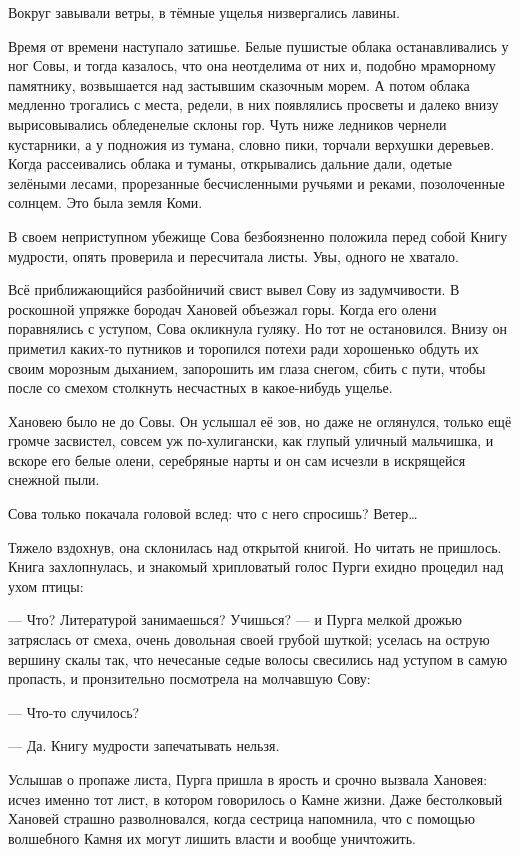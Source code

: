 \documentclass[oneside,final,14pt]{extreport}
\begin{document}
	Вокруг завывали ветры, в тёмные ущелья низвергались лавины.
	
	Время от времени наступало затишье. Белые пушистые облака останавливались у ног Совы, и тогда казалось, что она неотделима от них и, подобно мраморному памятнику, возвышается над застывшим сказочным морем. А потом облака медленно трогались с места, редели, в них появлялись просветы и далеко внизу вырисовывались обледенелые склоны гор. Чуть ниже ледников чернели кустарники, а у подножия из тумана, словно пики, торчали верхушки деревьев. Когда рассеивались облака и туманы, открывались дальние дали, одетые зелёными лесами, прорезанные бесчисленными ручьями и реками, позолоченные солнцем. Это была земля Коми.
	
	В своем неприступном убежище Сова безбоязненно положила перед собой Книгу мудрости, опять проверила и пересчитала листы. Увы, одного не хватало.
	
	Всё приближающийся разбойничий свист вывел Сову из задумчивости. В роскошной упряжке бородач Хановей объезжал горы. Когда его олени поравнялись с уступом, Сова окликнула гуляку. Но тот не остановился. Внизу он приметил каких-то путников и торопился потехи ради хорошенько обдуть их своим морозным дыханием, запорошить им глаза снегом, сбить с пути, чтобы после со смехом столкнуть несчастных в какое-нибудь ущелье.
	
	Хановею было не до Совы. Он услышал её зов, но даже не оглянулся, только ещё громче засвистел, совсем уж по-хулигански, как глупый уличный мальчишка, и вскоре его белые олени, серебряные нарты и он сам исчезли в искрящейся снежной пыли.
	
	Сова только покачала головой вслед: что с него спросишь? Ветер…
	
	Тяжело вздохнув, она склонилась над открытой книгой. Но читать не пришлось. Книга захлопнулась, и знакомый хрипловатый голос Пурги ехидно процедил над ухом птицы:
	
	— Что? Литературой занимаешься? Учишься? — и Пурга мелкой дрожью затряслась от смеха, очень довольная своей грубой шуткой; уселась на острую вершину скалы так, что нечесаные седые волосы свесились над уступом в самую пропасть, и пронзительно посмотрела на молчавшую Сову:
	
	— Что-то случилось?
	
	— Да. Книгу мудрости запечатывать нельзя.
	
	Услышав о пропаже листа, Пурга пришла в ярость и срочно вызвала Хановея: исчез именно тот лист, в котором говорилось о Камне жизни. Даже бестолковый Хановей страшно разволновался, когда сестрица напомнила, что с помощью волшебного Камня их могут лишить власти и вообще уничтожить.
	
\end{document}
